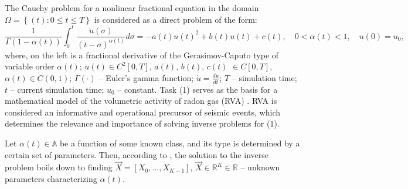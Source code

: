 \documentclass[12pt]{llncs}
\begin{document}
The Cauchy problem for a nonlinear fractional equation in the domain $\Omega=\left\lbrace(t) : 0\leq t\leq T\right\rbrace$ is considered as a direct problem of the form:
\begin{equation}
	\frac{1}{\Gamma(1 - \alpha(t))} \int_{0}^{t} \frac{\dot{u}(\sigma) }{(t - \sigma)^{\alpha(t)}} d\sigma = - a(t)u(t)^2 + b(t)u(t) + c(t), \quad 0<\alpha(t)<1, \quad u(0) = u_0,
\end{equation}
where, on the left is a fractional derivative of the Gerasimov-Caputo type of variable order $\alpha(t)$; $ u(t)\in C^2[0,T] $, $ a(t)$, $b(t)$, $c(t)$ $\in C[0,T]$, $ \alpha(t) \in C (0,1)$; $\Gamma(\cdot)$ -- Euler's gamma function; $\dot{u}=\frac{d u}{d t}$; $T$ -- simulation time; $t$ -- current simulation time; $u_0$ -- constant. Task (1) serves as the basis for a mathematical model of the volumetric activity of radon gas (RVA) \cite{DA_Solid_2022_Q1_hered_mod_anomaly_RVA_62}. RVA is considered an informative and operational precursor of seismic events, which determines the relevance and importance of solving inverse problems for (1).

Let $\alpha(t)\in\mathbb{A}$ be a function of some known class, and its type is determined by a certain set of parameters. Then, according to \cite{Tihonov_1977_eq_math_phys}, the solution to the inverse problem boils down to finding $\overrightarrow{X} = \left[X_{0}, ..., X_{K-1}\right]$, $\overrightarrow{X} \in\mathbb{ R }^{K} \in \mathbb{ R }$ -- unknown parameters characterizing $\alpha(t)$.
\end{document}
